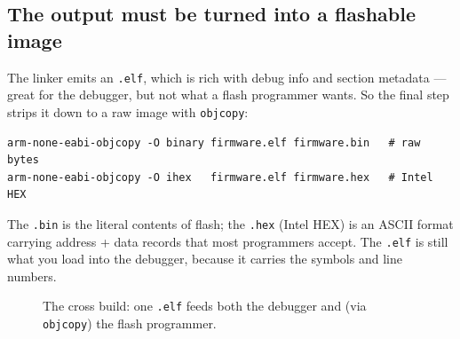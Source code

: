 \documentclass[11pt,a4paper,oneside]{book}
\newcommand{\code}[1]{\texttt{#1}}
\begin{document}
\subsection{The output must be turned into a flashable image}
The linker emits an \code{.elf}, which is rich with debug info and section
metadata --- great for the debugger, but not what a flash programmer wants. So
the final step strips it down to a raw image with \code{objcopy}:
\begin{lstlisting}[style=shell]
arm-none-eabi-objcopy -O binary firmware.elf firmware.bin   # raw bytes
arm-none-eabi-objcopy -O ihex   firmware.elf firmware.hex   # Intel HEX
\end{lstlisting}
The \code{.bin} is the literal contents of flash; the \code{.hex} (Intel HEX)
is an ASCII format carrying address + data records that most programmers accept.
The \code{.elf} is still what you load into the debugger, because it carries the
symbols and line numbers.

\begin{figure}[h]
\centering
{}
\caption{The cross build: one \code{.elf} feeds both the debugger and (via
\code{objcopy}) the flash programmer.}
\label{fig:cross-flow}
\end{figure}
\end{document}
